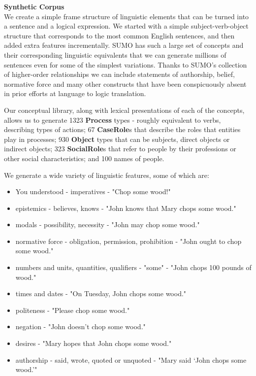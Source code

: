 \documentclass{easychair}
\begin{document}
\vspace{10pt}

\noindent\textbf{Synthetic Corpus}\\
\indent We create a simple frame structure of linguistic elements that can be
turned into a sentence and a logical expression.  We started with a simple subject-verb-object
structure that corresponds to the most common English sentences, and then added extra features
incrementally.  SUMO has such a large set of concepts and their corresponding linguistic
equivalents that we can generate millions of sentences even for some of the simplest variations.
Thanks to SUMO's collection of higher-order relationships we can include statements of authorship,
belief, normative force and many other constructs that have been conspicuously absent in prior
efforts at language to logic translation.

Our conceptual library, along with lexical presentations of each of the concepts, allows us to 
generate 1323 \textbf{Process} types - roughly equivalent to verbs, describing types of actions;  
67 \textbf{CaseRole}s that describe the roles that entities play in processes;
930 \textbf{Object} types that can be subjects, direct objects or indirect objects;
323 \textbf{SocialRole}s that refer to people by their professions or other social characteristics;
and 100 names of people.

We generate a wide variety of linguistic features, some of which are:
\vspace{-5pt}
\begin{itemize}
\setlength\itemsep{-2mm}
\item You understood - imperatives - "Chop some wood!"
\item epistemics - believes, knows - "John knows that Mary chops some wood."
\item modals - possibility, necessity - "John may chop some wood."
\item normative force - obligation, permission, prohibition - "John ought to chop some wood."
\item numbers and units, quantities, qualifiers - "some" - "John chops 100 pounds of wood."
\item times and dates - "On Tuesday, John chops some wood."
\item politeness - "Please chop some wood."
\item negation - "John doesn't chop some wood."
\item desires - "Mary hopes that John chops some wood."
\item authorship - said, wrote, quoted or unquoted - "Mary said `John chops some wood.'"
\end{itemize}
\end{document}
